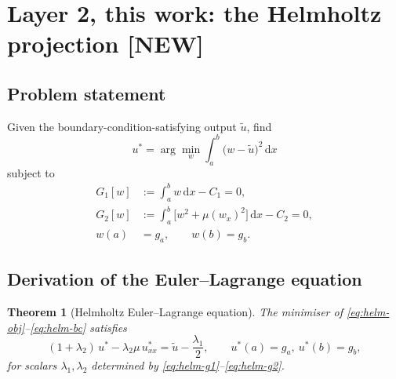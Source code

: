 \documentclass[11pt,a4paper]{article}
\newtheorem{theorem}{Theorem}
\theoremstyle{remark}
\newcommand{\dx}{\,\mathrm{d}x}
\newcommand{\ut}{\tilde{u}}
\newcommand{\us}{u^{*}}
\begin{document}
\section{Layer 2, this work: the Helmholtz projection \textbf{[NEW]}}
\label{sec:helm}

\subsection{Problem statement}

Given the boundary-condition-satisfying output $\ut$, find
\begin{equation}
\us = \arg\min_{w} \int_a^b \big(w-\ut\big)^2\dx
\label{eq:helm-obj}
\end{equation}
subject to
\begin{align}
G_1[w] &:= \int_a^b w \dx - C_1 = 0, \label{eq:helm-g1}\\
G_2[w] &:= \int_a^b \Big[w^2 + \mu (w_x)^2\Big]\dx - C_2 = 0, \label{eq:helm-g2}\\
w(a) &= g_a, \qquad w(b) = g_b. \label{eq:helm-bc}
\end{align}

\subsection{Derivation of the Euler--Lagrange equation}

\begin{theorem}[Helmholtz Euler--Lagrange equation]
\label{thm:el}
The minimiser of \eqref{eq:helm-obj}--\eqref{eq:helm-bc} satisfies
\begin{equation}
\boxed{\ (1+\lambda_2)\,\us - \lambda_2\mu\,\us_{xx} = \ut - \frac{\lambda_1}{2},
\qquad \us(a)=g_a,\ \us(b)=g_b, \ }
\label{eq:helmholtz}
\end{equation}
for scalars $\lambda_1,\lambda_2$ determined by \eqref{eq:helm-g1}--\eqref{eq:helm-g2}.
\end{theorem}
\end{document}
